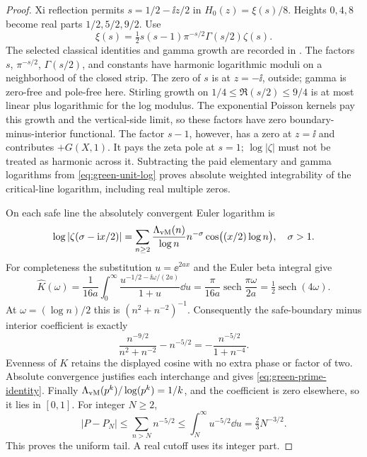 \begin{proof}
Xi reflection permits \(s=1/2-\ii z/2\) in \(H_0(z)=\xi(s)/8\).
Heights \(0,4,8\) become real parts \(1/2,5/2,9/2\). Use
\[
 \xi(s)=\tfrac12s(s-1)\pi^{-s/2}\Gamma(s/2)\zeta(s).
\]
The selected classical identities and gamma growth are recorded in
\cite{DLMFGreenPrime}. The factors \(s\), \(\pi^{-s/2}\),
\(\Gamma(s/2)\), and constants have harmonic logarithmic moduli on
a neighborhood of the closed strip. The zero of \(s\) is at \(z=-\ii\),
outside; gamma is zero-free and pole-free here. Stirling growth on
\(1/4\le\Re(s/2)\le9/4\) is at most linear plus logarithmic for
the log modulus. The exponential Poisson kernels pay this growth and
the vertical-side limit, so these factors have zero
boundary-minus-interior functional. The factor \(s-1\), however, has
a zero at \(z=\ii\) and contributes \emph{\(+G(X,1)\)}. It pays the
zeta pole at \(s=1\); \(\log|\zeta|\) must not be treated as harmonic
across it. Subtracting the paid elementary and gamma logarithms from
\eqref{eq:green-unit-log} proves absolute weighted integrability of
the critical-line logarithm, including real multiple zeros.

On each safe line the absolutely convergent Euler logarithm is
\[
 \log|\zeta(\sigma-\mathrm i x/2)|
   =\sum_{n\ge2}\frac{\Lambda_{\rm vM}(n)}{\log n}
                     n^{-\sigma}\cos\bigl((x/2)\log n\bigr),\quad\sigma>1.
\]
For completeness the substitution \(u=\ee^{2ax}\) and the Euler beta
integral give
\[
 \widehat K(\omega)=\frac1{16a}\int_0^\infty
       \frac{u^{-1/2-\ii\omega/(2a)}}{1+u}\dd u
   =\frac\pi{16a}\operatorname{sech}\frac{\pi\omega}{2a}
   =\tfrac12\operatorname{sech}(4\omega).
\]
At \(\omega=(\log n)/2\) this is \((n^2+n^{-2})^{-1}\).
Consequently the safe-boundary minus interior coefficient is exactly
\begin{equation}\label{eq:green-safe-coefficient}
 \frac{n^{-9/2}}{n^2+n^{-2}}-n^{-5/2}
                         =-\frac{n^{-5/2}}{1+n^{-4}}.
\end{equation}
Evenness of \(K\) retains the displayed cosine with no extra phase or
factor of two. Absolute convergence justifies each interchange and gives
\eqref{eq:green-prime-identity}. Finally
\(\Lambda_{\rm vM}(p^k)/\log(p^k)=1/k\), and the coefficient is zero
elsewhere, so it lies in \([0,1]\). For integer \(N\ge2\),
\[
 |P-P_N|\le\sum_{n>N}n^{-5/2}
       \le\int_N^\infty u^{-5/2}\dd u=\tfrac23N^{-3/2}.
\]
This proves the uniform tail. A real cutoff uses its integer part.
\end{proof}

